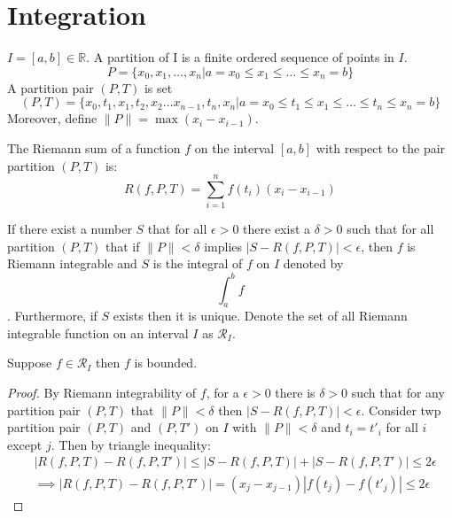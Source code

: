 \chapter{Integration}
\begin{definition}[Partition]
    \(I = [a,b] \in \mathbb{R}\). A partition of I is a finite ordered sequence of points in \(I\).
    \begin{equation*}
        P = \{x_0, x_1, \dots, x_n | a = x_0 \leq x_1 \leq \dots \leq x_n = b\}
    \end{equation*}
    A partition pair \((P,T)\) is set
    \begin{equation*}
        (P,T) = \{x_0, t_1,x_1, t_2,x_2 \dots x_{n-1}, t_n, x_n | a = x_0 \leq t_1 \leq x_1 \leq \dots \leq t_n \leq x_n = b\}
    \end{equation*}
    Moreover, define \(\|P\| = \max{(x_i - x_{i-1})}\).
\end{definition}
The Riemann sum of a function \(f\) on the interval \([a,b]\) with respect to the pair partition \((P,T)\) is:
\begin{equation*}
    R(f,P,T)= \sum_{i = 1}^{n} {f(t_i)(x_i - x_{i-1})}
\end{equation*}
\begin{definition}
    If there exist a number \(S\) that for all \(\epsilon > 0\) there exist a \(\delta > 0\) such that for all partition \((P,T)\) that if \(\|P\| < \delta\) implies \(|S - R(f,P,T)| < \epsilon\), then \(f\) is Riemann integrable and \(S\) is the integral of \(f\) on \(I\) denoted by
    \begin{equation*}
        \int_{a}^{b}{f}
    \end{equation*}
    . Furthermore, if \(S\) exists then it is unique.
    Denote the set of all Riemann integrable function on an interval \(I\) as \(\mathcal{R}_I\).
\end{definition}
\begin{theorem}
    Suppose \(f \in \mathcal{R}_I\) then \(f\) is bounded.
\end{theorem}
\begin{proof}
    By Riemann integrability of \(f\), for a \(\epsilon > 0\) there is \(\delta > 0\) such that for any partition pair \((P,T)\) that \(\|P\| < \delta\) then \(|S - R(f,P,T)| < \epsilon\). Consider twp partition pair \((P,T)\) and \((P,T')\) on \(I\) with  \(\|P\| < \delta\) and \(t_i = t'_i\) for all \(i\) except \(j\). Then by triangle inequality:
    \begin{align*}
         & |R(f,P,T) - R(f,P,T')| \leq |S - R(f,P,T)| + |S - R(f,P,T')| \leq 2 \epsilon       \\
         & \implies |R(f,P,T) - R(f,P,T')| = (x_j - x_{j-1})|f(t_j) - f(t'_j)| \leq 2\epsilon
    \end{align*}
\end{proof}
